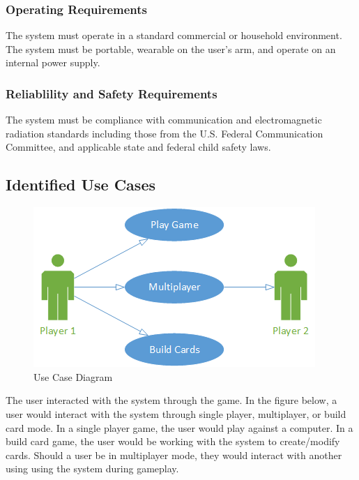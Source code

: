 \documentclass[12pt]{article} %
\begin{document}
\subsubsection{Operating Requirements}

The system must operate in a standard commercial or household environment. The system must be portable, wearable on the user's arm, and operate on an internal power supply.

\subsubsection{Reliablility and Safety Requirements}

The system must be compliance with communication and electromagnetic radiation
standards including those from the U.S. Federal Communication Committee, and
applicable state and federal child safety laws.

\subsection{Identified Use Cases}\label{sec:identifiedUseCases} %

\begin{figure}[H]
	\centering
	\includegraphics[width=\textwidth]{images/UseCaseDiagram.png}
	\caption{Use Case Diagram}
	\label{fig:funDecomp}
\end{figure}

The user interacted with the system through the game. In the figure below, a user would interact with the system through single player,
multiplayer, or build card mode. In a single player game, the user would play against a computer. In a build card game, the user would be working
with the system to create/modify cards. Should a user be in multiplayer mode, they would interact with another using using the system during gameplay.
\end{document}
